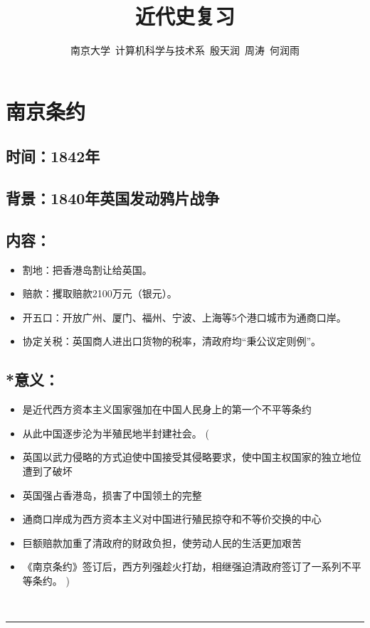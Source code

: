 \documentclass{article}
\begin{document}
\title{近代史复习}

\author{南京大学~计算机科学与技术系~殷天润~周涛~何润雨}
\maketitle

\section*{南京条约}
\subsection*{时间：1842年}
\subsection*{背景：1840年英国发动鸦片战争}

\subsection*{内容：}
\begin{itemize}
    \item 割地：把香港岛割让给英国。
    \item 赔款：攫取赔款2100万元（银元）。
    \item 开五口：开放广州、厦门、福州、宁波、上海等5个港口城市为通商口岸。
    \item 协定关税：英国商人进出口货物的税率，清政府均“秉公议定则例”。
\end{itemize}
\subsection*{*意义：}
\begin{itemize}
   \item 是近代西方资本主义国家强加在中国人民身上的第一个不平等条约
   \item 从此中国逐步沦为半殖民地半封建社会。
  ( \item 英国以武力侵略的方式迫使中国接受其侵略要求，使中国主权国家的独立地位遭到了破坏
   \item 英国强占香港岛，损害了中国领土的完整
   \item 通商口岸成为西方资本主义对中国进行殖民掠夺和不等价交换的中心
   \item 巨额赔款加重了清政府的财政负担，使劳动人民的生活更加艰苦
   \item 《南京条约》签订后，西方列强趁火打劫，相继强迫清政府签订了一系列不平等条约。
  )
\end{itemize}
\ \hrule
\end{document}
